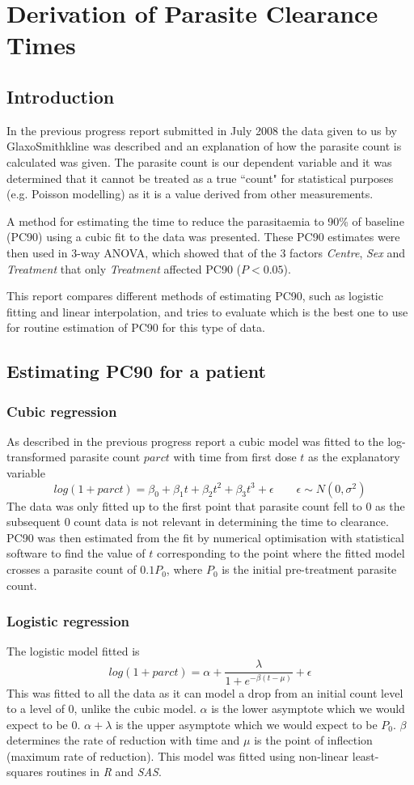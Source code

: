 \chapter{Derivation of Parasite Clearance Times}
\section{Introduction}
In the previous progress report submitted in July 2008 the data given to us by GlaxoSmithkline was described and an explanation of how the parasite count is calculated was given. The parasite count is our dependent variable and it was determined that it cannot be treated as a true ``count" for statistical purposes (e.g. Poisson modelling) as it is a value derived from other measurements.

A method for estimating the time to reduce the parasitaemia to 90\% of baseline (PC90) using a cubic fit to the data was presented. These PC90 estimates were then used in 3-way ANOVA, which showed that of the 3 factors \emph{Centre}, \emph{Sex} and \emph{Treatment} that only \emph{Treatment} affected PC90 ($P<0.05$).

This report compares different methods of estimating PC90, such as logistic fitting and linear interpolation, and tries to evaluate which is the best one to use for routine estimation of PC90 for this type of data.
\section{Estimating PC90 for a patient}
\subsection{Cubic regression}
As described in the previous progress report a cubic model was fitted to the log-transformed parasite count $parct$ with time from first dose $t$ as the explanatory variable
$$log(1+parct)=\beta_0+\beta_1t+\beta_2t^2+\beta_3t^3+\epsilon\quad\quad\epsilon\sim N(0,\sigma^2)$$
The data was only fitted up to the first point that parasite count fell to 0 as the subsequent 0 count data is not relevant in determining the time to clearance. PC90 was then estimated from the fit by numerical optimisation with statistical software to find the value of $t$ corresponding to the point where the fitted model crosses a parasite count of $0.1P_0$, where $P_0$ is the initial pre-treatment parasite count.
\subsection{Logistic regression}
The logistic model fitted is
$$log(1+parct)=\alpha+\frac{\lambda}{1+e^{-\beta(t-\mu)}}+\epsilon$$
This was fitted to all the data as it can model a drop from an initial count level to a level of 0, unlike the cubic model. $\alpha$ is the lower asymptote which we would expect to be 0. $\alpha+\lambda$ is the upper asymptote which we would expect to be $P_0$. $\beta$ determines the rate of reduction with time and $\mu$ is the point of inflection (maximum rate of reduction). This model was fitted using non-linear least-squares routines in \emph{R} and \emph{SAS}.
